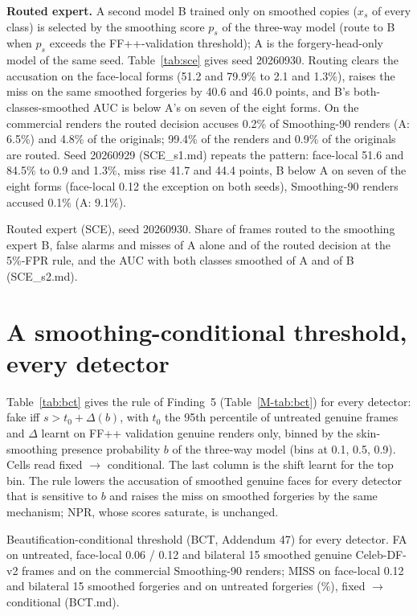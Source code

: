 \documentclass[10pt]{article}
\begin{document}
\textbf{Routed expert.} A second model B trained only on smoothed copies ($x_s$ of every class) is selected by the smoothing
score $p_s$ of the three-way model (route to B when $p_s$ exceeds the FF++-validation threshold); A is the forgery-head-only
model of the same seed. Table~\ref{tab:sce} gives seed 20260930. Routing clears the accusation on
the face-local forms (51.2 and 79.9\% to 2.1 and 1.3\%), raises the miss on the same smoothed forgeries by 40.6 and 46.0
points, and B's both-classes-smoothed AUC is below A's on seven of the eight forms. On the commercial renders the routed
decision accuses 0.2\% of Smoothing-90 renders (A: 6.5\%) and 4.8\% of the originals; 99.4\% of the renders and 0.9\% of the
originals are routed. Seed 20260929 (SCE\_s1.md) repeats the pattern: face-local 51.6 and 84.5\% to 0.9 and 1.3\%, miss rise
41.7 and 44.4 points, B below A on seven of the eight forms (face-local 0.12 the exception on both seeds), Smoothing-90 renders
accused 0.1\% (A: 9.1\%).
\begin{table}[H]
\centering
\caption{Routed expert (SCE), seed 20260930. Share of frames routed to the smoothing expert B, false alarms and misses of A
alone and of the routed decision at the 5\%-FPR rule, and the AUC with both classes smoothed of A and of B (SCE\_s2.md).}
\label{tab:sce}
\scriptsize
\begin{adjustbox}{max width=\linewidth}\end{adjustbox}
\end{table}

\section{A smoothing-conditional threshold, every detector}
\label{sec:bct}
Table~\ref{tab:bct} gives the rule of Finding~5 (Table~\ref{M-tab:bct}) for every detector: fake iff $s>t_0+\Delta(b)$, with
$t_0$ the 95th percentile of untreated genuine frames and $\Delta$ learnt on FF++ validation genuine renders only, binned by the
skin-smoothing presence probability $b$ of the three-way model (bins at 0.1, 0.5, 0.9). Cells read fixed $\rightarrow$
conditional. The last column is the shift learnt for the top bin. The rule lowers the accusation of smoothed genuine faces for
every detector that is sensitive to $b$ and raises the miss on smoothed forgeries by the same mechanism; NPR, whose scores
saturate, is unchanged.
\begin{table}[H]
\centering
\caption{Beautification-conditional threshold (BCT, Addendum 47) for every detector. FA on untreated, face-local 0.06 / 0.12
and bilateral 15 smoothed genuine Celeb-DF-v2 frames and on the commercial Smoothing-90 renders; MISS on face-local 0.12 and
bilateral 15 smoothed forgeries and on untreated forgeries (\%), fixed $\rightarrow$ conditional (BCT.md).}
\label{tab:bct}
\scriptsize
\begin{adjustbox}{max width=\linewidth}\end{adjustbox}
\end{table}
\end{document}
